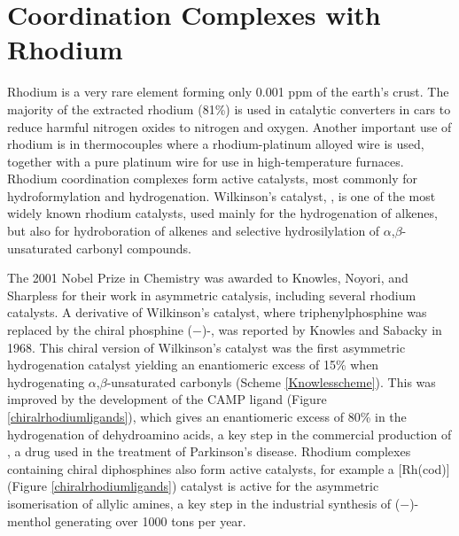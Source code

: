 
\chapter{Coordination Complexes with Rhodium}
\label{ch:rhodium}

Rhodium is a very rare element forming only 0.001 ppm of the earth's crust.\cite{Enghag2004Rhabundance}  The majority of the extracted rhodium (81\%) is used in catalytic converters in cars to reduce harmful nitrogen oxides to nitrogen and oxygen.\cite{Heck2001}  Another important use of rhodium is in thermocouples where a rhodium-platinum alloyed wire is used, together with a pure platinum wire for use in high-temperature furnaces.\cite{Enghag2004Rh}  Rhodium coordination complexes form active catalysts, most commonly for hydroformylation and hydrogenation.\cite{Leeuwenbook2000, Cui2005, Pospech2013}  Wilkinson's catalyst, , is one of the most widely known rhodium catalysts, used mainly for the hydrogenation of alkenes, but also for hydroboration of alkenes and selective hydrosilylation of $\alpha$,$\beta$-unsaturated carbonyl compounds.\cite{Osborn1966, Evans1988, Ojima1982}

The 2001 Nobel Prize in Chemistry was awarded to Knowles,\cite{Knowles2002} Noyori,\cite{Noyori2002} and Sharpless\cite{Sharpless2002} for their work in asymmetric catalysis, including several rhodium catalysts.  A derivative of Wilkinson's catalyst, where triphenylphosphine was replaced by the chiral phosphine ($-$)-, was reported by Knowles and Sabacky in 1968\cite{Knowles1968}.  This chiral version of Wilkinson's catalyst was the first asymmetric hydrogenation catalyst yielding an enantiomeric excess of 15\% when hydrogenating $\alpha$,$\beta$-unsaturated carbonyls (Scheme \ref{Knowlesscheme}).  This was improved by the development of the CAMP ligand (Figure \ref{chiralrhodiumligands}), which gives an enantiomeric excess of 80\% in the hydrogenation of dehydroamino acids, a key step in the commercial production of , a drug used in the treatment of Parkinson's disease.\cite{Noyori2007}  Rhodium complexes containing chiral diphosphines also form active catalysts, for example a [Rh(\acrshort{cod})] (Figure \ref{chiralrhodiumligands}) catalyst is active for the asymmetric isomerisation of allylic amines, a key step in the industrial synthesis of ($-$)-menthol generating over 1000 tons per year.\cite{Noyori2002}

